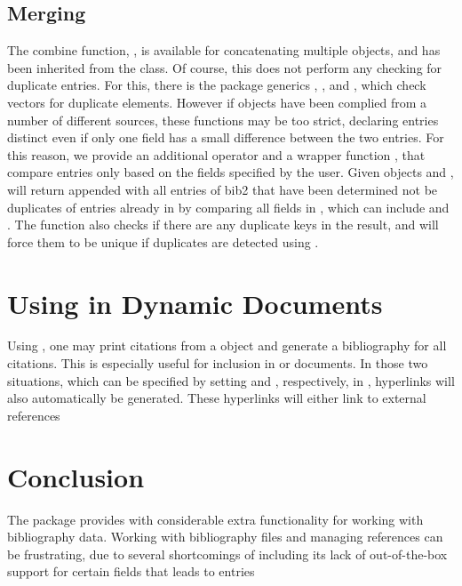 \documentclass[article]{jss}\usepackage[]{graphicx}\usepackage[]{color}
\newcommand{\ourpkg}{\pkg{RefManageR}}
\begin{document}
\subsection{Merging}
The combine function, , is available for concatenating multiple  objects, and has been inherited from the  class.  Of course, this does not perform any checking for duplicate entries.  For this, there is the  package generics , , and , which check vectors for duplicate elements.  However if  objects have been complied from a number of different sources, these functions may be too strict, declaring entries distinct even if only one field has a small difference between the two entries.  For this reason, we provide an additional operator  and a wrapper function , that compare entries only based on the fields specified by the user.  Given  objects  and ,  will return  appended with all entries of bib2 that have been determined not be duplicates of entries already in  by comparing all fields in , which can include  and .  The function also checks if there are any duplicate keys in the result, and will force them to be unique if duplicates are detected using . 

\section[Using RefManageR in Dynamic Documents]{Using \ourpkg{} in Dynamic Documents}\label{sec_cite}
Using \ourpkg{}, one may print citations from a  object and generate a bibliography for all citations.  This is especially useful for inclusion in  or  documents.  In those two situations, which can be specified by setting  and , respectively, in , hyperlinks will also automatically be generated.  These hyperlinks will either link to external references
\section{Conclusion}\label{sec_conc}
The \ourpkg{} package provides \R{} with considerable extra functionality for working with bibliography data.  Working with \Bibtex{} bibliography files and managing references can be frustrating, due to several shortcomings of \Bibtex{} including its lack of out-of-the-box support for certain fields that leads to entries 

\end{document}
